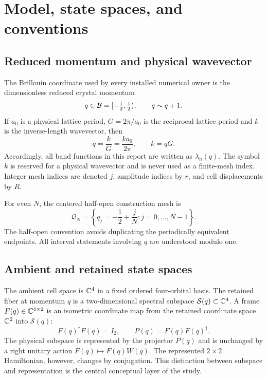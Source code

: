 \section{Model, state spaces, and conventions}

\subsection{Reduced momentum and physical wavevector}

The Brillouin coordinate used by every installed numerical owner is the dimensionless
reduced crystal momentum
\begin{equation}
 q\in\mathcal B=[-\tfrac12,\tfrac12),\qquad q\sim q+1.
\end{equation}
If $a_0$ is a physical lattice period, $G=2\pi/a_0$ is the reciprocal-lattice period
and $k$ is the inverse-length wavevector, then
\begin{equation}
 q=\frac{k}{G}=\frac{k a_0}{2\pi},\qquad k=qG.
 \label{eq:reduced-physical-relation}
\end{equation}
Accordingly, all band functions in this report are written as $\lambda_n(q)$.
The symbol $k$ is reserved for a physical wavevector and is never used as a finite-mesh
index.  Integer mesh indices are denoted $j$, amplitude indices by $r$, and cell
displacements by $R$.

For even $N$, the centered half-open construction mesh is
\begin{equation}
 \mathcal Q_N=\left\{q_j=-\frac12+\frac{j}{N}:j=0,\ldots,N-1\right\}.
 \label{eq:centered-mesh}
\end{equation}
The half-open convention avoids duplicating the periodically equivalent endpoints.
All interval statements involving $q$ are understood modulo one.

\subsection{Ambient and retained state spaces}

The ambient cell space is $\mathbb C^4$ in a fixed ordered four-orbital basis.  The
retained fiber at momentum $q$ is a two-dimensional spectral subspace
$\mathcal S(q)\subset\mathbb C^4$.  A frame
$F(q)\in\mathbb C^{4\times2}$ is an isometric coordinate map from the retained
coordinate space $\mathbb C^2$ into $\mathcal S(q)$:
\begin{equation}
 F(q)^\dagger F(q)=I_2,
 \qquad
 P(q)=F(q)F(q)^\dagger.
 \label{eq:frame-projector}
\end{equation}
The physical subspace is represented by the projector $P(q)$ and is unchanged by a
right unitary action $F(q)\mapsto F(q)W(q)$.  The represented $2\times2$ Hamiltonian,
however, changes by conjugation.  This distinction between subspace and representation
is the central conceptual layer of the study.

